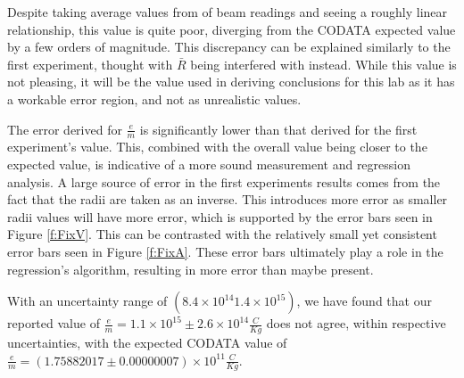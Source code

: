 \documentclass[12pt]{article}
\newcommand{\paren}[1]{\left( {#1} \right)}
\begin{document}
Despite taking average values from of beam readings and seeing a roughly linear relationship, this value is quite poor, diverging from the CODATA expected value by a few orders of magnitude. This discrepancy can be explained similarly to the first experiment, thought with $\bar{R}$ being interfered with instead. While this value is not pleasing, it will be the value used in deriving conclusions for this lab as it has a workable error region, and not as unrealistic values. 

The error derived for $\frac{e}{m}$ is significantly lower than that derived for the first experiment's value. This, combined with the overall value being closer to the expected value, is indicative of a more sound measurement and regression analysis. A large source of error in the first experiments results comes from the fact that the radii are taken as an inverse. This introduces more error as smaller radii values will have more error, which is supported by the error bars seen in Figure \ref{f:FixV}. This can be contrasted with the relatively small yet consistent error bars seen in Figure \ref{f:FixA}. These error bars ultimately play a role in the regression's algorithm, resulting in more error than maybe present.

With an uncertainty range of $\paren{8.4\times10^{14}1.4\times10^{15}}$, we have found that our reported value of $\frac{e}{m}=1.1\times10^{15}\pm2.6\times10^{14} \frac{C}{Kg}$ does not agree, within respective uncertainties, with the expected CODATA value of $\frac{e}{m}=(1.75882017\pm0.00000007)\times10^{11} \frac{C}{Kg}$.

\end{document}
